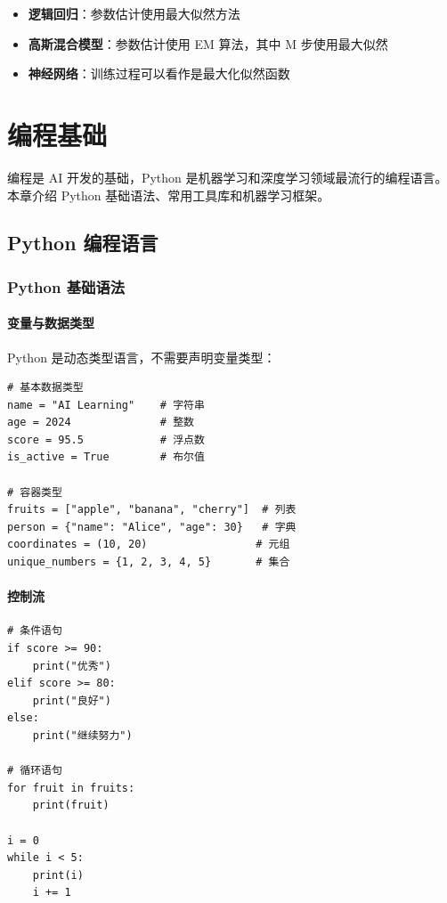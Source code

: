 \documentclass[12pt,UTF8]{ctexbook}
\begin{document}
\begin{itemize}[leftmargin=2cm]
    \item \textbf{逻辑回归}：参数估计使用最大似然方法
    \item \textbf{高斯混合模型}：参数估计使用 EM 算法，其中 M 步使用最大似然
    \item \textbf{神经网络}：训练过程可以看作是最大化似然函数
\end{itemize}

\chapter{编程基础}
\label{chap:programming}

编程是 AI 开发的基础，Python 是机器学习和深度学习领域最流行的编程语言。本章介绍 Python 基础语法、常用工具库和机器学习框架。

\section{Python 编程语言}
\label{sec:python}

\subsection{Python 基础语法}

\subsubsection{变量与数据类型}

Python 是动态类型语言，不需要声明变量类型：

\begin{lstlisting}
# 基本数据类型
name = "AI Learning"    # 字符串
age = 2024              # 整数
score = 95.5            # 浮点数
is_active = True        # 布尔值

# 容器类型
fruits = ["apple", "banana", "cherry"]  # 列表
person = {"name": "Alice", "age": 30}   # 字典
coordinates = (10, 20)                 # 元组
unique_numbers = {1, 2, 3, 4, 5}       # 集合
\end{lstlisting}

\subsubsection{控制流}

\begin{lstlisting}
# 条件语句
if score >= 90:
    print("优秀")
elif score >= 80:
    print("良好")
else:
    print("继续努力")

# 循环语句
for fruit in fruits:
    print(fruit)

i = 0
while i < 5:
    print(i)
    i += 1
\end{lstlisting}
\end{document}
